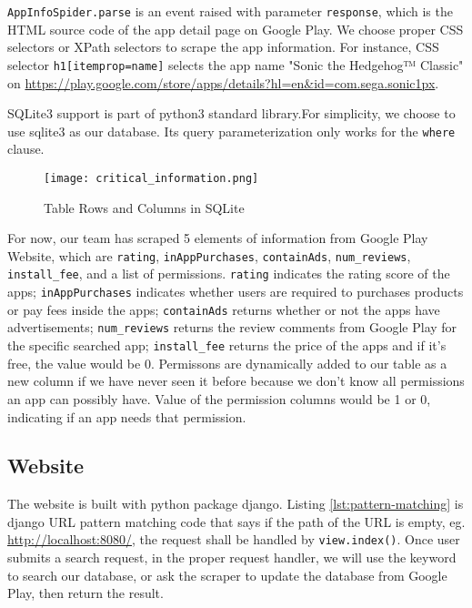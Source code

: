 \documentclass[12pt, a4paper]{article}
\newcommand{\code}[1]{\texttt{#1}}
\begin{document}
\code{AppInfoSpider.parse} is an event raised with parameter \code{response}, which is the HTML source code of the app detail page on Google Play. We choose proper CSS selectors or XPath selectors to scrape the app information. For instance, CSS selector \code{h1[itemprop=name]} selects the app name "Sonic the Hedgehog™ Classic" on \url{https://play.google.com/store/apps/details?hl=en&id=com.sega.sonic1px}.

SQLite3 support is part of python3 standard library.\textsuperscript{\cite{python-sqlite}}For simplicity, we choose to use sqlite3 as our database. Its query parameterization only works for the \code{where} clause.\textsuperscript{\cite{sqliteC++}}

\begin{figure}[ht]
\centering
\texttt{[image: critical\_information.png]}
\caption{Table Rows and Columns in SQLite}
\label{fig:critical-information}
\end{figure}

For now, our team has scraped 5 elements of information from Google Play Website, which are \code{rating}, \code{inAppPurchases}, \code{containAds}, \code{num\linebreak[4]\_reviews}, \code{install\_fee}, and a list of permissions. \code{rating} indicates the rating score of the apps; \code{inAppPurchases} indicates whether users are required to purchases products or pay fees inside the apps; \code{containAds} returns whether or not the apps have advertisements; \code{num\linebreak[2]\_reviews} returns the review comments from Google Play for the specific searched app; \code{install\_fee} returns the price of the apps and if it’s free, the value would be 0. Permissons are dynamically added to our table as a new column if we have never seen it before because we don't know all permissions an app can possibly have. Value of the permission columns would be 1 or 0, indicating if an app needs that permission.

\subsection{Website}
The website is built with python package django\textsuperscript{\cite{django}}. Listing \ref{lst:pattern-matching} is django URL pattern matching code that says if the path of the URL is empty, eg. \url{http://localhost:8080/}, the request shall be handled by \code{view.index()}. Once user submits a search request, in the proper request handler, we will use the keyword to search our database, or ask the scraper to update the database from Google Play, then return the result.
\end{document}
